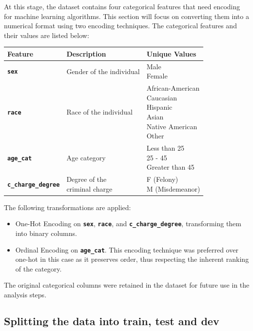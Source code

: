 At this stage, the dataset contains four categorical features that need encoding for machine learning algorithms. This section will focus on converting them into a numerical format using two encoding techniques. The categorical features and their values are listed below:

\begin{table}[!ht]
	\centering
	\begin{tabular}{|l|l|l|}
		\hline
		Feature & Description & Unique Values \\ \hline\hline
		\textbf{\texttt{sex}} & Gender of the individual & \shortstack{Male\\Female} \\ \hline
		\textbf{\texttt{race}} & Race of the individual & \shortstack[l]{African-American\\Caucasian\\Hispanic\\Asian\\Native American\\Other} \\ \hline
		\textbf{\texttt{age\_cat}} & Age category & \shortstack[l]{Less than 25\\25 - 45\\Greater than 45} \\ \hline
		\textbf{\texttt{c\_charge\_degree}} & \shortstack{Degree of the\\criminal charge} & \shortstack[l]{F (Felony)\\M (Misdemeanor)} \\ \hline
	\end{tabular}
\end{table}

The following transformations are applied:

\begin{itemize}[]
	\item One-Hot Encoding on \textbf{\texttt{sex}}, \textbf{\texttt{race}}, and \textbf{\texttt{c\_charge\_degree}}, transforming them into binary columns.
	\item Ordinal Encoding on \textbf{\texttt{age\_cat}}. This encoding technique was preferred over one-hot in this case as it preserves order, thus respecting the inherent ranking of the category.
\end{itemize}

The original categorical columns were retained in the dataset for future use in the analysis steps. 

\subsection{Splitting the data into train, test and dev}

